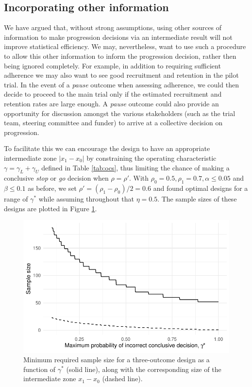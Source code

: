 \documentclass{bmcart}
\begin{document}
\subsection{Incorporating other information}\label{sec:information}

We have argued that, without strong assumptions, using other sources of information to make progression decisions via an intermediate result will not improve statistical efficiency. We may, nevertheless, want to use such a procedure to allow this other information to inform the progression decision, rather then being ignored completely. For example, in addition to requiring sufficient adherence we may also want to see good recruitment and retention in the pilot trial. In the event of a \emph{pause} outcome when assessing adherence, we could then decide to proceed to the main trial only if the estimated recruitment and retention rates are large enough. A \emph{pause} outcome could also provide an opportunity for discussion amongst the various stakeholders (such as the trial team, steering committee and funder) to arrive at a collective decision on progression.

To facilitate this we can encourage the design to have an appropriate intermediate zone $| x_1 - x_0|$ by constraining the operating characteristic $\gamma = \gamma_L + \gamma_U$ defined in Table \ref{tab:ocs}, thus limiting the chance of making a conclusive \emph{stop} or \emph{go} decision when $\rho = \rho'$. With $\rho_0 = 0.5, \rho_1 = 0.7, \alpha \leq 0.05$ and $\beta \leq 0.1$ as before, we set $\rho' = (\rho_1 - \rho_0)/2 = 0.6$ and found optimal designs for a range of $\gamma^*$ while assuming throughout that $\eta = 0.5$. The sample sizes of these designs are plotted in Figure \ref{fig:gamma_ns}.

\begin{figure}
\centering
\includegraphics[scale=0.8]{./figures/gamma_ns}
\caption{Minimum required sample size for a three-outcome design as a function of $\gamma^*$ (solid line), along with the corresponding size of the intermediate zone $x_1 - x_0$ (dashed line).}
\label{fig:gamma_ns}
\end{figure}
\end{document}

